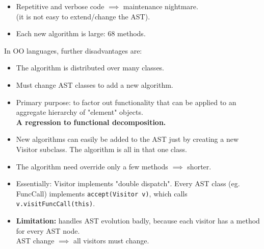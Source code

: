 \begin{slide}

\begin{itemize}
\item Repetitive and verbose code $\implies$ maintenance nightmare.\\
  (it is not easy to extend/change the AST).
\item Each new algorithm is large: 68 methods.
\end{itemize}

In OO languages, further disadvantages are:
\begin{itemize}
\item The algorithm is distributed over many classes.
\item Must change AST classes to add a new algorithm.
\end{itemize}
\end{slide}

\begin{slide}

\begin{itemize}
\item Primary purpose: to factor out functionality that can be
  applied to an aggregate hierarchy of "element" objects.
  \\
  \textbf{A regression to functional decomposition.}
\item New algorithms can easily be added to the AST just
  by creating a new Visitor subclass.  The algorithm is all
  in that one class.
\item The algorithm need override only a few methods $\implies$ shorter.
\item Essentially: Visitor implements "double dispatch".
  Every AST class (eg. FuncCall) implements 
  \texttt{accept(Visitor v)}, which calls
  \texttt{v.visitFuncCall(this)}.
\item \textbf{Limitation:} handles AST evolution badly, because
  each visitor has a method for every AST node.
  \\
  AST change $\implies$ all visitors must change.
\end{itemize}
\end{slide}

